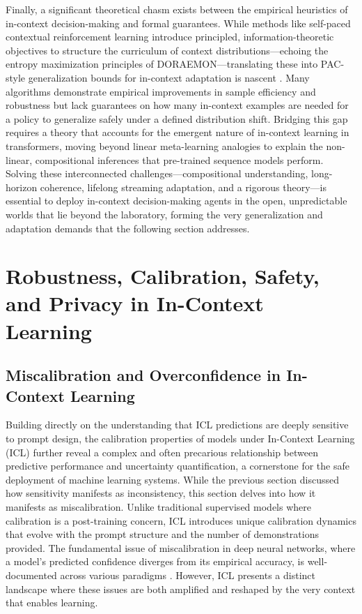 \documentclass[11pt]{article}
\begin{document}
Finally, a significant theoretical chasm exists between the empirical heuristics of in-context decision-making and formal guarantees. While methods like self-paced contextual reinforcement learning introduce principled, information-theoretic objectives to structure the curriculum of context distributions---echoing the entropy maximization principles of DORAEMON---translating these into PAC-style generalization bounds for in-context adaptation is nascent \cite{ref320}. Many algorithms demonstrate empirical improvements in sample efficiency and robustness but lack guarantees on how many in-context examples are needed for a policy to generalize safely under a defined distribution shift. Bridging this gap requires a theory that accounts for the emergent nature of in-context learning in transformers, moving beyond linear meta-learning analogies to explain the non-linear, compositional inferences that pre-trained sequence models perform. Solving these interconnected challenges---compositional understanding, long-horizon coherence, lifelong streaming adaptation, and a rigorous theory---is essential to deploy in-context decision-making agents in the open, unpredictable worlds that lie beyond the laboratory, forming the very generalization and adaptation demands that the following section addresses.

\section{Robustness, Calibration, Safety, and Privacy in In-Context Learning}

\subsection{Miscalibration and Overconfidence in In-Context Learning}

Building directly on the understanding that ICL predictions are deeply sensitive to prompt design, the calibration properties of models under In-Context Learning (ICL) further reveal a complex and often precarious relationship between predictive performance and uncertainty quantification, a cornerstone for the safe deployment of machine learning systems. While the previous section discussed how sensitivity manifests as inconsistency, this section delves into how it manifests as miscalibration. Unlike traditional supervised models where calibration is a post-training concern, ICL introduces unique calibration dynamics that evolve with the prompt structure and the number of demonstrations provided. The fundamental issue of miscalibration in deep neural networks, where a model's predicted confidence diverges from its empirical accuracy, is well-documented across various paradigms \cite{ref418}. However, ICL presents a distinct landscape where these issues are both amplified and reshaped by the very context that enables learning.
\end{document}
